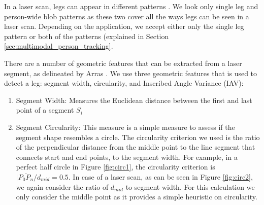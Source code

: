 \documentclass[12pt]{gatech-thesis}
\begin{document}
In a laser scan, legs can appear in different patterns \cite{topp2005tracking}. We look only single leg and person-wide blob patterns as these two cover all the ways legs can be seen in a laser scan. Depending on the application, we accept either only the single leg pattern or both of the patterns (explained in Section \ref{sec:multimodal_person_tracking}.

There are a number of geometric features that can be extracted from a laser segment, as delineated by Arras \cite{arras2007using}. We use three geometric features that is used to detect a leg: segment width, circularity, and Inscribed Angle Variance (IAV):


\begin{enumerate}
\item Segment Width: Measures the Euclidean distance between the first and last point of a segment $S_i$




\item Segment Circularity: This measure is a simple measure to assess if the segment shape resembles a circle. The circularity criterion we used is the ratio of the perpendicular distance from the middle point to the line segment that connects start and end points, to the segment width. For example, in a perfect half circle in Figure \ref{fig:circ1}, the circularity criterion is $|\overline{P_0P_n}/d_{mid}=0.5$. In case of a laser scan, as can be seen in Figure \ref{fig:circ2}, we again consider the ratio of $d_{mid}$ to segment width. For this calculation we only consider the middle point as it provides a simple heuristic on circularity.


\end{enumerate}
\end{document}
